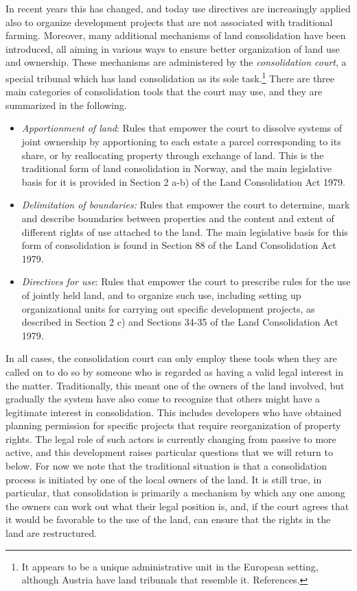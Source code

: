 In recent years this has changed, and today use directives are increasingly applied also to organize development projects that are not associated with traditional farming. Moreover, many additional mechanisms of land consolidation have been introduced, all aiming in various ways to ensure better organization of land use and ownership. These mechanisms are administered by the \emph{consolidation court}, a special tribunal which has land consolidation as its sole task.\footnote{It appears to be a unique administrative unit in the European setting, although Austria have land tribunals that resemble it. References.} There are three main categories of consolidation tools that the court may use, and they are summarized in the following.

\begin{itemize}
\item \emph{Apportionment of land}: Rules that empower the court to dissolve systems of joint ownership by apportioning to each estate a parcel corresponding to its share, or by reallocating property through exchange of land. This is the traditional form of land consolidation in Norway, and the main legislative basis for it is provided in Section 2 a-b) of the Land Consolidation Act 1979.
\item \emph{Delimitation of boundaries:} Rules that empower the court to determine, mark and describe boundaries between properties and the content and extent of different rights of use attached to the land. The main legislative basis for this form of consolidation is found in Section 88 of the Land Consolidation Act 1979.
\item \emph{Directives for use}: Rules that empower the court to prescribe rules for the use of jointly held land, and to organize such use, including setting up organizational units for carrying out specific development projects, as described in Section 2 c) and Sections 34-35 of the Land Consolidation Act 1979. 
\end{itemize}

In all cases, the consolidation court can only employ these tools when they are called on to do so by someone who is regarded as having a valid legal interest in the matter. Traditionally, this meant one of the owners of the land involved, but gradually the system have also come to recognize that others might have a legitimate interest in consolidation. This includes developers who have obtained planning permission for specific projects that require reorganization of property rights. The legal role of such actors is currently changing from passive to more active, and this development raises particular questions that we will return to below. For now we note that the traditional situation is that a consolidation process is initiated by one of the local owners of the land. It is still true, in particular, that consolidation is primarily a mechanism by which any one among the owners can work out what their legal position is, and, if the court agrees that it would be favorable to the use of the land, can ensure that the rights in the land are restructured.

